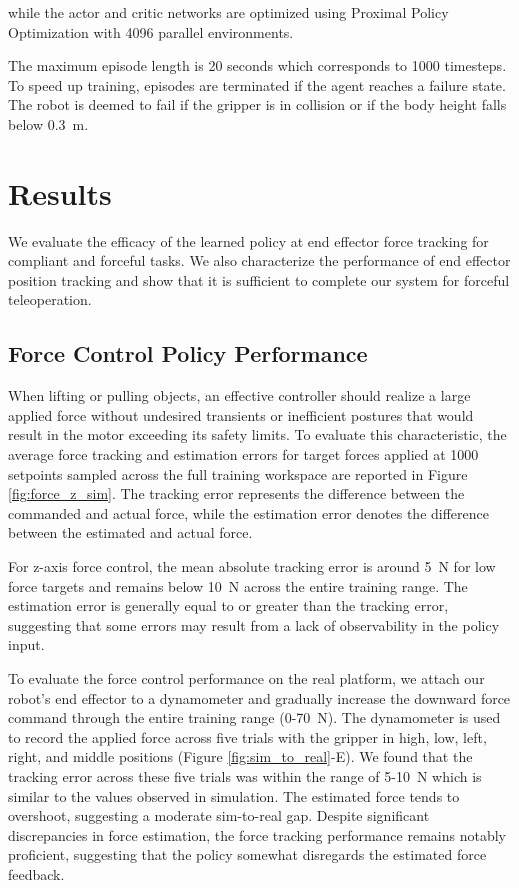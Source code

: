 while the actor and critic networks are optimized using Proximal Policy Optimization \cite{schulman2017proximal} with 4096 parallel environments. 

The maximum episode length is 20 seconds which corresponds to 1000 timesteps.
To speed up training, episodes are terminated if the agent reaches a failure state. 
The robot is deemed to fail if the gripper is in collision or if the body height falls below \SI{0.3}{\meter}.

\section{Results}
\label{sec:results}

We evaluate the efficacy of the learned policy at end effector force tracking for compliant and forceful tasks.
We also characterize the performance of end effector position tracking and show that it is sufficient to complete our system for forceful teleoperation.


\subsection{Force Control Policy Performance}

\label{sec:large_forces}

When lifting or pulling objects, an effective controller should realize a large applied force without undesired transients or inefficient postures that would result in the motor exceeding its safety limits. To evaluate this characteristic, the average force tracking and estimation errors for target forces applied at 1000 setpoints sampled across the full training workspace are reported in Figure \ref{fig:force_z_sim}. The tracking error represents the difference between the commanded and actual force, while the estimation error denotes the difference between the estimated and actual force.

For z-axis force control, the mean absolute tracking error is around \SI{5}{\newton} for low force targets and remains below \SI{10}{\newton} across the entire training range. The estimation error is generally equal to or greater than the tracking error, suggesting that some errors may result from a lack of observability in the policy input.  


To evaluate the force control performance on the real platform, we attach our robot's end effector to a dynamometer and gradually increase the downward force command through the entire training range (\SI{0}{}-\SI{70}{\newton}). The dynamometer is used to record the applied force across five trials with the gripper in high, low, left, right, and middle positions (Figure \ref{fig:sim_to_real}-E). 
We found that the tracking error across these five trials was within the range of \SI{5}{}-\SI{10}{\newton} which is similar to the values observed in simulation. The estimated force tends to overshoot, suggesting a moderate sim-to-real gap. Despite significant discrepancies in force estimation, the force tracking performance remains notably proficient, suggesting that the policy somewhat disregards the estimated force feedback.


